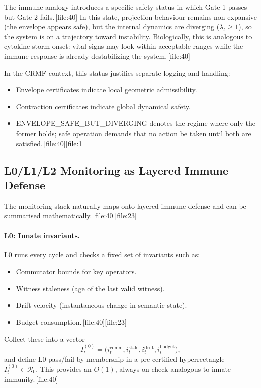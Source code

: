 \documentclass[11pt]{article}
\begin{document}
The immune analogy introduces a specific safety status in which Gate 1 passes but Gate 2 fails.\,[file:40]
In this state, projection behaviour remains non-expansive (the envelope appears safe), but the internal dynamics are diverging (\(\lambda_t\ge 1\)), so the system is on a trajectory toward instability.
Biologically, this is analogous to cytokine-storm onset: vital signs may look within acceptable ranges while the immune response is already destabilizing the system.\,[file:40]

In the CRMF context, this status justifies separate logging and handling:
\begin{itemize}
  \item Envelope certificates indicate local geometric admissibility.
  \item Contraction certificates indicate global dynamical safety.
  \item ENVELOPE\_SAFE\_BUT\_DIVERGING denotes the regime where only the former holds; safe operation demands that no action be taken until both are satisfied.\,[file:40][file:1]
\end{itemize}

\subsection*{L0/L1/L2 Monitoring as Layered Immune Defense}

The monitoring stack naturally maps onto layered immune defense and can be summarised mathematically.\,[file:40][file:23]

\paragraph{L0: Innate invariants.}

L0 runs every cycle and checks a fixed set of invariants such as:
\begin{itemize}
  \item Commutator bounds for key operators.
  \item Witness staleness (age of the last valid witness).
  \item Drift velocity (instantaneous change in semantic state).
  \item Budget consumption.\,[file:40][file:23]
\end{itemize}
Collect these into a vector
\[
I^{(0)}_t = \big(i^{\mathrm{comm}}_t, i^{\mathrm{stale}}_t, i^{\mathrm{drift}}_t, i^{\mathrm{budget}}_t\big),
\]
and define L0 pass/fail by membership in a pre-certified hyperrectangle \(I^{(0)}_t\in\mathcal{R}_0\).
This provides an \(O(1)\), always-on check analogous to innate immunity.\,[file:40]
\end{document}
